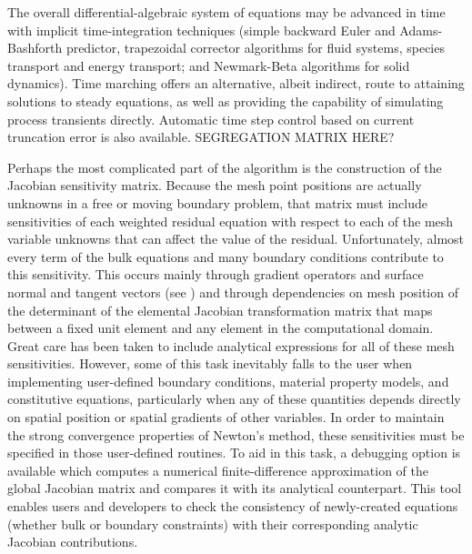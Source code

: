 The overall differential-algebraic system of equations may be advanced in time with implicit time-integration techniques (simple backward Euler and Adams-Bashforth predictor, trapezoidal corrector algorithms for fluid systems, species transport and energy transport; and Newmark-Beta algorithms for solid dynamics). Time marching offers an alternative, albeit indirect, route to attaining solutions to steady equations, as well as providing the capability of simulating process transients directly. Automatic time step control based on current truncation error is also available. SEGREGATION MATRIX HERE?

Perhaps the most complicated part of the algorithm is the construction of the Jacobian sensitivity matrix. Because the mesh point positions are actually unknowns in a free or moving boundary problem, that matrix must include sensitivities of each weighted residual equation with respect to each of the mesh variable unknowns that can affect the value of the residual. Unfortunately, almost every term of the bulk equations and many boundary conditions contribute to this sensitivity. This occurs mainly through gradient operators and surface normal and tangent vectors (see \citealt{KistlerScrivenCoatingFlow}) and through dependencies on mesh position of the determinant of the elemental Jacobian transformation matrix that maps between a fixed unit element and any element in the computational domain. Great care has been taken to include analytical expressions for all of these mesh sensitivities. However, some of this task inevitably falls to the user when implementing user-defined boundary conditions, material property models, and constitutive equations, particularly when any of these quantities depends directly on spatial position or spatial gradients of other variables. In order to maintain the strong convergence properties of Newton’s method, these sensitivities must be specified in those user-defined routines. To aid in this task, a debugging option is available which computes a numerical finite-difference approximation of the global Jacobian matrix and compares it with its analytical counterpart. This tool enables users and developers to check the consistency of newly-created equations (whether bulk or boundary constraints) with their corresponding analytic Jacobian contributions.
%
%
